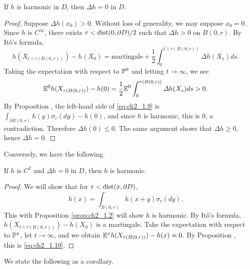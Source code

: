 \begin{proposition}\label{prop:ch2_1.5}
If $h$ is harmonic in $D$, then $\Delta h = 0$ in $D$.
\end{proposition}

\begin{proof}
Suppose $\Delta h(x_0) > 0$. Without loss of generality, we may suppose $x_0 = 0$. Since $h$ is $C^\infty$, there exists $r < \dist(0,\partial D)/2$ such that $\Delta h > 0$ on $B(0,r)$. By It\^o's formula,
\begin{equation}\label{eq:ch2_1.8}
    h(X_{t\wedge\tau(B(0,r))}) - h(X_0) = \text{martingale} + \frac{1}{2}\int_0^{t\wedge\tau(B(0,r))} \Delta h(X_s)ds.
\end{equation}
Taking the expectation with respect to $\P^0$ and letting $t \to \infty$, we see
\begin{equation}\label{eq:ch2_1.9}
    \E^0 h(X_{\tau(B(0,r))}) - h(0) = \frac{1}{2}\E^0 \int_0^{\tau(B(0,r))} \Delta h(X_s)ds > 0.
\end{equation}
By Proposition , the left-hand side of \eqref{eq:ch2_1.9} is $\int_{\partial B(0,r)} h(y)\sigma_r(dy)-h(0)$, and since $h$ is harmonic, this is $0$, a contradiction. Therefore $\Delta h(0) \leq 0$. The same argument shows that $\Delta h \geq 0$, hence $\Delta h = 0$.
\end{proof}

Conversely, we have the following.

\begin{proposition}\label{prop:ch2_1.6}
If $h$ is $C^2$ and $\Delta h = 0$ in $D$, then $h$ is harmonic.
\end{proposition}

\begin{proof}
We will show that for $r < \dist(x,\partial D)$,
\begin{equation}\label{eq:ch2_1.10}
    h(x) = \int_{B(0,r)} h(x + y)\sigma_r(dy).
\end{equation}
This with Proposition \ref{prop:ch2_1.2} will show $h$ is harmonic. By It\^o's formula, $h(X_{t\wedge\tau(B(0,r))}) - h(X_0)$ is a martingale. Take the expectation with respect to $\P^x$, let $t \to \infty$, and we obtain $\E^x h(X_{\tau(B(0,r))}) - h(x) = 0$. By Proposition , this is \eqref{eq:ch2_1.10}.
\end{proof}


We state the following as a corollary.

